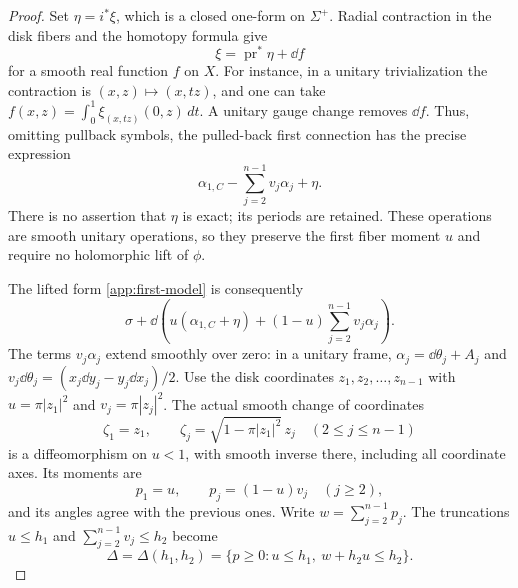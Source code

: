 \begin{proof}
Set $\eta=i^*\xi$, which is a closed one-form on $\Sigma^+$. Radial contraction
in the disk fibers and the homotopy formula give
\[
 \xi=\operatorname{pr}^*\eta+\dd f
\]
for a smooth real function $f$ on $X$. For instance, in a unitary
trivialization the contraction is $(x,z)\mapsto(x,tz)$, and one can take
$f(x,z)=\int_0^1\xi_{(x,tz)}(0,z)\,dt$. A unitary gauge change removes
$\dd f$. Thus, omitting pullback symbols, the pulled-back first connection
has the precise expression
\begin{equation}\label{app:lifted-connection}
 \alpha_{1,C}-\sum_{j=2}^{n-1}v_j\alpha_j+\eta.
\end{equation}
There is no assertion that $\eta$ is exact; its periods are retained.
These operations are smooth unitary operations, so they preserve the first
fiber moment $u$ and require no holomorphic lift of $\phi$.

The lifted form \eqref{app:first-model} is consequently
\begin{equation}\label{app:lifted-form}
 \sigma+\dd\left(u(\alpha_{1,C}+\eta)
                  +(1-u)\sum_{j=2}^{n-1}v_j\alpha_j\right).
\end{equation}
The terms $v_j\alpha_j$ extend smoothly over zero: in a unitary frame,
$\alpha_j=\dd\theta_j+A_j$ and
$v_j\dd\theta_j=(x_j\dd y_j-y_j\dd x_j)/2$.
Use the disk coordinates $z_1,z_2,\ldots,z_{n-1}$ with
$u=\pi|z_1|^2$ and $v_j=\pi|z_j|^2$. The actual smooth change of coordinates
\begin{equation}\label{app:moment-change}
 \zeta_1=z_1,\qquad
 \zeta_j=\sqrt{1-\pi|z_1|^2}\,z_j\quad(2\le j\le n-1)
\end{equation}
is a diffeomorphism on $u<1$, with smooth inverse there, including all
coordinate axes. Its moments are
\[
 p_1=u,\qquad p_j=(1-u)v_j\quad(j\ge2),
\]
and its angles agree with the previous ones. Write
$w=\sum_{j=2}^{n-1}p_j$. The truncations $u\le h_1$ and
$\sum_{j=2}^{n-1}v_j\le h_2$ become
\begin{equation}\label{app:large-polytope}
 \Delta=\Delta(h_1,h_2)=
 \{p\ge0:u\le h_1,\ w+h_2u\le h_2\}.
\end{equation}


\end{proof}
